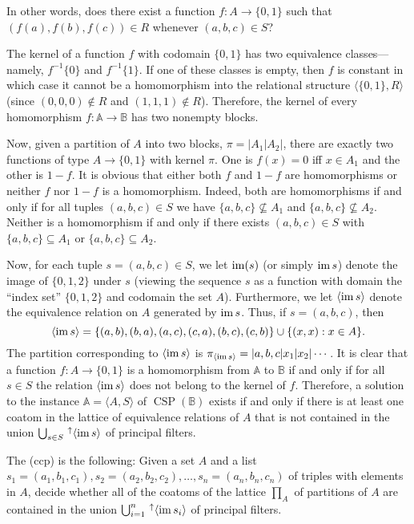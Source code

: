 \documentclass[12pt]{amsart}
\numberwithin{equation}{section}
\theoremstyle{plain}
\theoremstyle{definition}
\newcommand{\ccp}{\acs{ccp}\xspace}
\begin{document}
In other words, does there exist a function
$f\colon A \rightarrow \{0,1\}$ such that $(f(a), f(b), f(c)) \in R$ whenever
$(a, b, c) \in S$?

The kernel of a function $f$ with codomain $\{0,1\}$ has two equivalence
classes---namely, $f^{-1}\{0\}$ and $f^{-1}\{1\}$.
If one of these classes is empty, then $f$ is constant 
in which case it cannot be a homomorphism into the relational structure
$\langle \{0, 1\}, R\rangle$ (since $(0,0,0)\notin R$ and $(1,1,1)\notin R$).
Therefore, the kernel of every homomorphism $f \colon \mathbb A \rightarrow \mathbb B$
has two nonempty blocks.

Now, given a partition of $A$ into two blocks, $\pi = |A_1|A_2|$,
there are exactly two functions of type $A \rightarrow \{0,1\}$
with kernel $\pi$. One is $f(x) = 0$ iff $x \in A_1$ and the other is $1-f$.
It is obvious that either both $f$ and $1-f$ are homomorphisms or neither $f$
nor $1-f$ is a homomorphism. Indeed, both are homomorphisms if and only if
for all tuples $(a,b,c) \in S$ we have $\{a,b,c\} \nsubseteq A_1$ and
$\{a,b,c\} \nsubseteq A_2$.
Neither is a homomorphism if and only if there exists
$(a,b,c) \in S$ with $\{a,b,c\} \subseteq A_1$ or
$\{a,b,c\} \subseteq A_2$.

Now, for each tuple $s = (a,b,c) \in S$, we let $\operatorname{im}(s)$ (or simply $\operatorname{im} s$)  denote the image of
$\{0,1,2\}$ under $s$ (viewing the sequence $s$ as a function with domain the 
``index set'' $\{0,1,2\}$ and codomain the set $A$).
Furthermore, we let $\langle \operatorname{im} s\rangle$ denote the equivalence relation on $A$
generated by $\operatorname{im} s$.  Thus, if $s = (a,b,c)$, then 
\[
\langle \operatorname{im} s \rangle = \{(a,b), (b,a), (a,c), (c,a), (b,c), (c,b)\} \cup \{(x,x) : x \in A\}.
\]
The partition corresponding to $\langle \operatorname{im} s \rangle$ is
$\pi_{\langle \operatorname{im} s\rangle} = |a, b, c|x_1|x_2|\cdots$.
It is clear that a function $f\colon A \rightarrow \{0, 1\}$ is a homomorphism from
$\mathbb A$ to $\mathbb B$ if and only if for all $s \in S$
the relation $\langle \operatorname{im} s\rangle$ does not belong to the kernel of $f$.
Therefore, a solution to the instance $\mathbb A = \langle A, S \rangle$ of
$\operatorname{CSP}(\mathbb B)$ exists if and only if there is at least one coatom
in the lattice of equivalence relations of $A$ that is not contained in the union
$ \bigcup_{s\in S} \, ^\uparrow\langle \operatorname{im} s \rangle $ of principal filters.

The  (\ccp) is the following:
Given a set $A$ and a list
$s_1 = (a_1, b_1, c_1), s_2=(a_2, b_2, c_2), \dots, s_n =(a_n, b_n, c_n)$
of triples with elements in $A$, decide whether all of the coatoms
of the lattice $\prod_A$ of partitions of $A$ are contained in the union
$ \bigcup_{i=1}^n \, ^\uparrow\langle \operatorname{im} s_i \rangle$ of principal filters.
\end{document}
